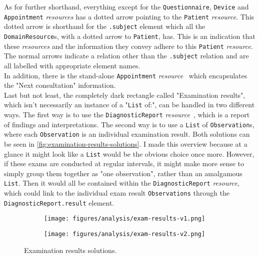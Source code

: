 \noindent
As for further shorthand, everything except for the \texttt{Questionnaire}, \texttt{Device} and \texttt{Appointment} \emph{resources} has a dotted arrow pointing to the \texttt{Patient} \emph{resource}. This dotted arrow is shorthand for the \texttt{.subject} element which all the \texttt{DomainResource}s, with a dotted arrow to \texttt{Patient}, has. This is an indication that these \emph{resources} and the information they convey adhere to this \texttt{Patient} \emph{resource}. The normal arrows indicate a relation other than the \texttt{.subject} relation and are all labelled with appropriate element names.
\\
In addition, there is the stand-alone \texttt{Appointment} \emph{resource}~\cite{FHIR-Appointment-resource} which encapsulates the "Next consultation" information.
\\
Last but not least, the completely dark rectangle called "Examination results", which isn't necessarily an instance of a "\texttt{List} of:", can be handled in two different ways. The first way is to use the \texttt{DiagnosticReport} \emph{resource}~\cite{FHIR-DiagnosticReport-resource}, which is a report of findings and interpretations. The second way is to use a \texttt{List} of \texttt{Observation}s, where each \texttt{Observation} is an individual examination result. Both solutions can be seen in \autoref{fig:examination-results-solutions}. I made this overview because at a glance it might look like a \texttt{List} would be the obvious choice once more. However, if these exams are conducted at regular intervals, it might make more sense to simply group them together as "one observation", rather than an amalgamous \texttt{List}. Then it would all be contained within the \texttt{DiagnosticReport} \emph{resource}, which could link to the individual exam result \texttt{Observations} through the \texttt{DiagnosticReport.result} element.

\begin{figure}[H]
    \centering
    \begin{subfigure}[t]{0.70\textwidth}
        \centering
        \texttt{[image: figures/analysis/exam-results-v1.png]}
    \end{subfigure}
    \hfill
    \begin{subfigure}[t]{0.25\textwidth}
        \centering
        \texttt{[image: figures/analysis/exam-results-v2.png]}
    \end{subfigure}
    \caption{Examination results solutions.}
    \label{fig:examination-results-solutions}
\end{figure}

